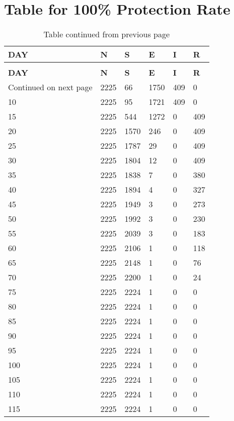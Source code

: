 \chapter{Table for 100\% Protection Rate}


\begin{longtable}{|l|l|l|l|l|l|}
	\caption{0\% Exposed Rate} \\
	
	\toprule
	\textbf{DAY} & \textbf{N} & \textbf{S} & \textbf{E }& \textbf{I} &\textbf{ R} \\
	\midrule
	\endfirsthead
	\caption*{Table continued from previous page} \\
	\toprule
	\textbf{DAY} & \textbf{N} & \textbf{S} & \textbf{E }& \textbf{I} &\textbf{ R} \\
	\midrule
	\endhead
	\midrule
	\multicolumn{1}{r}{\footnotesize Continued on next page}
	\endfoot
	\bottomrule
	\endlastfoot
5 & 2225 & 66 & 1750 & 409 & 0 \\
10 & 2225 & 95 & 1721 & 409 & 0 \\
15 & 2225 & 544 & 1272 & 0 & 409 \\
20 & 2225 & 1570 & 246 & 0 & 409 \\
25 & 2225 & 1787 & 29 & 0 & 409 \\
30 & 2225 & 1804 & 12 & 0 & 409 \\
35 & 2225 & 1838 & 7 & 0 & 380 \\
40 & 2225 & 1894 & 4 & 0 & 327 \\
45 & 2225 & 1949 & 3 & 0 & 273 \\
50 & 2225 & 1992 & 3 & 0 & 230 \\
55 & 2225 & 2039 & 3 & 0 & 183 \\
60 & 2225 & 2106 & 1 & 0 & 118 \\
65 & 2225 & 2148 & 1 & 0 & 76 \\
70 & 2225 & 2200 & 1 & 0 & 24 \\
75 & 2225 & 2224 & 1 & 0 & 0 \\
80 & 2225 & 2224 & 1 & 0 & 0 \\
85 & 2225 & 2224 & 1 & 0 & 0 \\
90 & 2225 & 2224 & 1 & 0 & 0 \\
95 & 2225 & 2224 & 1 & 0 & 0 \\
100 & 2225 & 2224 & 1 & 0 & 0 \\
105 & 2225 & 2224 & 1 & 0 & 0 \\
110 & 2225 & 2224 & 1 & 0 & 0 \\
115 & 2225 & 2224 & 1 & 0 & 0 \\

\end{longtable}
